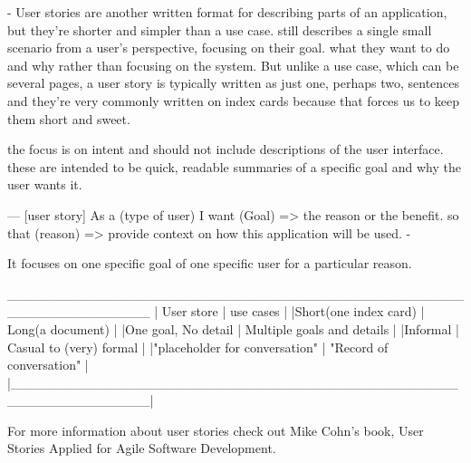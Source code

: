 - User stories
  are another written format for describing parts of an application,
  but they're shorter and simpler than a use case. 
  still describes a single small scenario from a user's perspective, focusing on their goal.
  what they want to do and why rather than focusing on the system. 
  But unlike a use case, which can be several pages, 
  a user story is typically written as just one, perhaps two, sentences 
  and they're very commonly written on index cards because that forces us to keep them short and sweet.

the focus is on intent and should not include descriptions of the user interface.
these are intended to be quick, readable summaries of a specific goal and why the user wants it.

---  [user story] 
  As a (type of user)
  I want  (Goal) => the reason or the benefit. 
  so that (reason)  => provide context on how this application will be used. -

It focuses on one specific goal of one specific user for a particular reason. 

_______________________________________________________________
|    User store                 |     use cases                |
|Short(one index card)          |  Long(a document)            |
|One goal, No detail            |  Multiple goals and details  |
|Informal                       |   Casual to (very) formal    |
|"placeholder for conversation" |  "Record of conversation"    |
|______________________________________________________________|

For more information about user stories check out Mike Cohn's book, User Stories Applied for Agile Software Development.